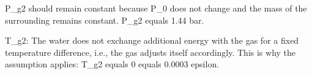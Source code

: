P_g2 should remain constant because P_0 does not change and the mass of the surrounding remains constant.  
P_g2 equals 1.44 bar.  

T_g2: The water does not exchange additional energy with the gas for a fixed temperature difference, i.e., the gas adjusts itself accordingly. This is why the assumption applies:  
T_g2 equals 0 equals 0.0003 epsilon.